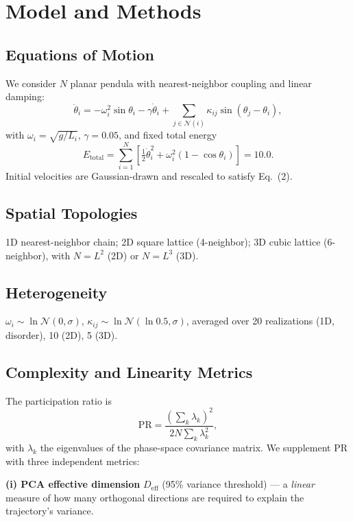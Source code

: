 \documentclass[aps,pre,12pt]{revtex4-2}
\begin{document}
\section{Model and Methods}

\subsection{Equations of Motion}
We consider $N$ planar pendula with nearest-neighbor coupling and linear damping:
\begin{equation}
    \ddot{\theta}_i = -\omega_i^2 \sin\theta_i - \gamma \dot{\theta}_i + \sum_{j \in \mathcal{N}(i)} \kappa_{ij} \sin(\theta_j - \theta_i),
\end{equation}
with $\omega_i=\sqrt{g/L_i}$, $\gamma=0.05$, and fixed total energy
\begin{equation}
    E_{\text{total}} = \sum_{i=1}^N \left[\tfrac{1}{2}\dot{\theta}_i^2+\omega_i^2(1-\cos\theta_i)\right] = 10.0.
\end{equation}
Initial velocities are Gaussian-drawn and rescaled to satisfy Eq.~(2).

\subsection{Spatial Topologies}
1D nearest-neighbor chain; 2D square lattice (4-neighbor); 3D cubic lattice (6-neighbor), with $N=L^2$ (2D) or $N=L^3$ (3D).

\subsection{Heterogeneity}
$\omega_i\sim\ln\mathcal{N}(0,\sigma)$, $\kappa_{ij}\sim\ln\mathcal{N}(\ln0.5,\sigma)$, averaged over 20 realizations (1D, disorder), 10 (2D), 5 (3D).

\subsection{Complexity and Linearity Metrics}
The participation ratio is
\begin{equation}
    \text{PR}=\frac{(\sum_k\lambda_k)^2}{2N\sum_k\lambda_k^2},
\end{equation}
with $\lambda_k$ the eigenvalues of the phase-space covariance matrix. We supplement PR with three independent metrics:

\textbf{(i) PCA effective dimension} $D_{\text{eff}}$ (95\% variance threshold) --- a \emph{linear} measure of how many orthogonal directions are required to explain the trajectory's variance.
\end{document}

